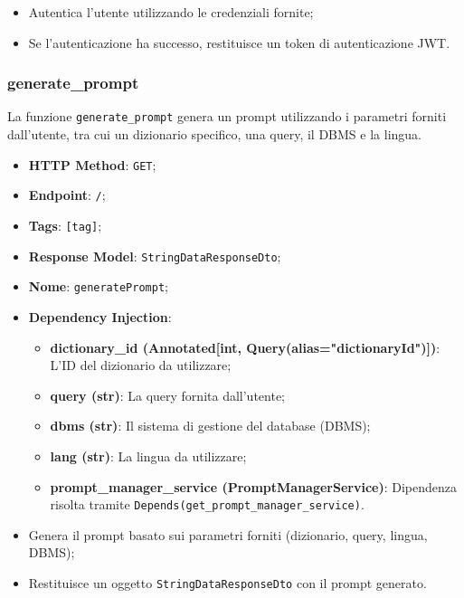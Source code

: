 \begin{itemize}
\item Autentica l'utente utilizzando le credenziali fornite;
\item Se l'autenticazione ha successo, restituisce un token di autenticazione JWT.
\end{itemize}



\subsubsection{generate\_prompt}

\par La funzione \texttt{generate\_prompt} genera un prompt utilizzando i parametri forniti dall'utente, tra cui un dizionario specifico, una query, il DBMS e la lingua.

\begin{itemize}
\item \textbf{HTTP Method}: \texttt{GET};
\item \textbf{Endpoint}: \texttt{/};
\item \textbf{Tags}: \texttt{[tag]};
\item \textbf{Response Model}: \texttt{StringDataResponseDto};
\item \textbf{Nome}: \texttt{generatePrompt};
\item \textbf{Dependency Injection}:
\begin{itemize}
\item \textbf{dictionary\_id (Annotated[int, Query(alias="dictionaryId")])}: L'ID del dizionario da utilizzare;
\item \textbf{query (str)}: La query fornita dall'utente;
\item \textbf{dbms (str)}: Il sistema di gestione del database (DBMS);
\item \textbf{lang (str)}: La lingua da utilizzare;
\item \textbf{prompt\_manager\_service (PromptManagerService)}: Dipendenza risolta tramite \texttt{Depends(get\_prompt\_manager\_service)}.
\end{itemize}
\end{itemize}

\begin{itemize}
\item Genera il prompt basato sui parametri forniti (dizionario, query, lingua, DBMS);
\item Restituisce un oggetto \texttt{StringDataResponseDto} con il prompt generato.
\end{itemize}

